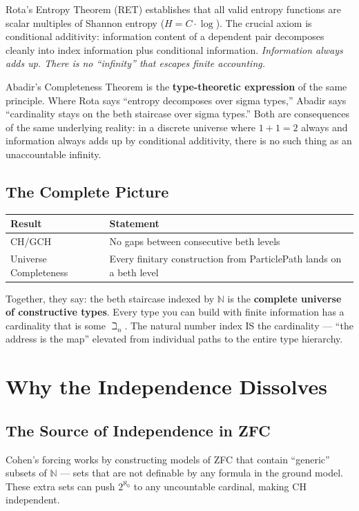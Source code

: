 \documentclass{report}
\begin{document}
Rota's Entropy Theorem (RET) establishes that all valid entropy functions
are scalar multiples of Shannon entropy ($H = C \cdot \log$). The crucial
axiom is conditional additivity: information content of a dependent pair
decomposes cleanly into index information plus conditional information.
\emph{Information always adds up. There is no ``infinity'' that escapes
finite accounting.}

Abadir's Completeness Theorem is the \textbf{type-theoretic expression}
of the same principle. Where Rota says ``entropy decomposes over sigma
types,'' Abadir says ``cardinality stays on the beth staircase over sigma
types.'' Both are consequences of the same underlying reality: in a discrete
universe where $1 + 1 = 2$ always and information always adds up by
conditional additivity, there is no such thing as an unaccountable infinity.

\subsection{The Complete Picture}

\begin{center}
\begin{tabular}{ll}
\textbf{Result} & \textbf{Statement} \\
\hline
CH/GCH & No gaps between consecutive beth levels \\
Universe Completeness & Every finitary construction from ParticlePath lands on a beth level \\
\end{tabular}
\end{center}

Together, they say: the beth staircase indexed by $\mathbb{N}$ is the
\textbf{complete universe of constructive types}. Every type you can build
with finite information has a cardinality that is some $\beth_n$. The natural
number index IS the cardinality --- ``the address is the map'' elevated from
individual paths to the entire type hierarchy.

\section{Why the Independence Dissolves}

\subsection{The Source of Independence in ZFC}

Cohen's forcing works by constructing models of ZFC that contain ``generic''
subsets of $\mathbb{N}$ --- sets that are not definable by any formula in the
ground model. These extra sets can push $2^{\aleph_0}$ to any uncountable
cardinal, making CH independent.
\end{document}
